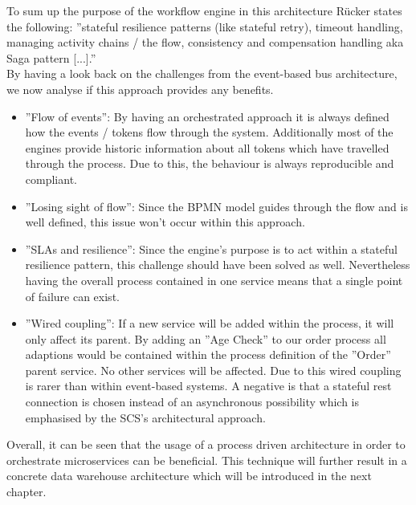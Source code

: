 To sum up the purpose of the workflow engine in this architecture Rücker states the following: ''stateful resilience patterns (like stateful retry), timeout handling, managing activity chains / the flow, consistency and compensation handling aka Saga pattern [...].'' \cite{orchestrationMicroServices}\newline
\\
By having a look back on the challenges from the event-based bus architecture, we now analyse if this approach provides any benefits. 
\begin{itemize}
    \item ''Flow of events'': By having an orchestrated approach it is always defined how the events / tokens flow through the system. Additionally most of the engines provide historic information about all tokens which have travelled through the process. Due to this, the behaviour is always reproducible and compliant. 
    \item ''Losing sight of flow'': Since the BPMN model guides through the flow and is well defined, this issue won't occur within this approach.
    \item ''SLAs and resilience'': Since the engine's purpose is to act within a stateful resilience pattern, this challenge should have been solved as well. Nevertheless having the overall process contained in one service means that a single point of failure can exist. 
    \item ''Wired coupling'': If a new service will be added within the process, it will only affect its parent. By adding an ''Age Check'' to our order process all adaptions would be contained within the process definition of the ''Order'' parent service. No other services will be affected. Due to this wired coupling is rarer than within event-based systems. A negative is that a stateful \acrshort{rest} connection is chosen instead of an asynchronous possibility which is emphasised by the SCS's architectural approach. 
\end{itemize}
Overall, it can be seen that the usage of a process driven architecture in order to orchestrate microservices can be beneficial. This technique will further result in a concrete data warehouse architecture which will be introduced in the next chapter. 
